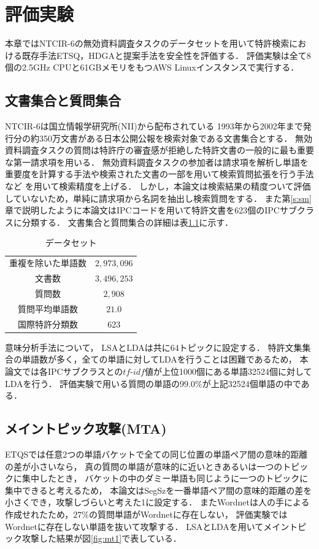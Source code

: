 \documentclass[master]{suribt}
\theoremstyle{definition}
\begin{document}
 \chapter{評価実験} \label{s:ex}
 本章ではNTCIR-6\cite{NTCIR6}の無効資料調査タスクのデータセットを用いて特許検索における既存手法ETSQ，HDGAと提案手法を安全性を評価する．
 評価実験は全て8個の2.5GHz CPUと61GBメモリをもつAWS Linuxインスタンスで実行する．

 \section{文書集合と質問集合}
 NTCIR-6は国立情報学研究所(NII)から配布されている
 1993年から2002年まで発行分の約350万文書がある日本公開公報を検索対象である文書集合とする．
 無効資料調査タスクの質問は特許庁の審査感が拒絶した特許文書の一般的に最も重要な第一請求項を用いる．
 無効資料調査タスクの参加者は請求項を解析し単語を重要度を計算する手法や検索された文書の一部を用いて検索質問拡張を行う手法など
 を用いて検索精度を上げる．
 しかし，本論文は検索結果の精度ついて評価していないため，単純に請求項から名詞を抽出し検索質問をする．
 また第\ref{s:sm}章で説明したように本論文はIPCコードを用いて特許文書を623個のIPCサブクラスに分類する．
 文書集合と質問集合の詳細は表\ref{tab:data}に示す． 

 \begin{table}[!hbp]
 \center
 \begin{tabular}{|c|c|}
 \hline
 重複を除いた単語数 & $2,973,096$  \\
 文書数 & $3,496,253$ \\
 質問数 & $2,908$ \\
 質問平均単語数 & $21.0$ \\
 国際特許分類数 & 623 \\
 \hline
 \end{tabular}
 \caption{データセット}
 \label{tab:data}
 \end{table}

 意味分析手法について，
 LSAとLDAは共に64トピックに設定する．
 特許文集集合の単語数が多く，全ての単語に対してLDAを行うことは困難であるため，
 本論文では各IPCサブクラスとの$tf\text{-}idf$値が上位1000個にある単語32524個に対してLDAを行う．
 評価実験で用いる質問の単語の$99.0\%$が上記32524個単語の中である．

 \section{メイントピック攻撃(MTA)}
 ETQSでは任意2つの単語バケットで全ての同じ位置の単語ペア間の意味的距離の差が小さいなら，
 真の質問の単語が意味的に近いときあるいは一つのトピックに集中したとき，
 バケットの中のダミー単語も同じように一つのトピックに集中できると考えるため，
 本論文はSegSzを一番単語ペア間の意味的距離の差を小さくでき，攻撃しづらいと考えた1に設定する．
 またWordnetは人の手による作成せれたため，$27\%$の質問単語がWordnetに存在しない，
 評価実験ではWordnetに存在しない単語を抜いて攻撃する．
 LSAとLDAを用いてメイントピック攻撃した結果が図\ref{fig:mt1}で表している．
  
\end{document}
